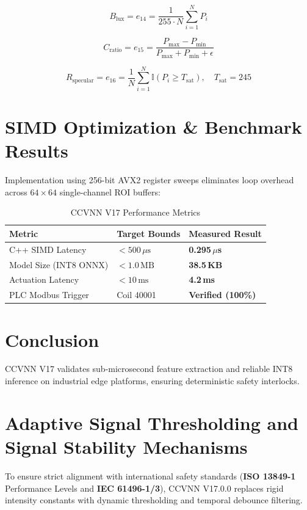 \documentclass[10pt,journal,compsoc]{IEEEtran}
\begin{document}
\begin{equation}
B_{\text{lux}} = e_{14} = \frac{1}{255 \cdot N} \sum_{i=1}^{N} P_i
\end{equation}

\begin{equation}
C_{\text{ratio}} = e_{15} = \frac{P_{\max} - P_{\min}}{P_{\max} + P_{\min} + \epsilon}
\end{equation}

\begin{equation}
R_{\text{specular}} = e_{16} = \frac{1}{N} \sum_{i=1}^{N} \mathbb{I}(P_i \ge T_{\text{sat}}), \quad T_{\text{sat}} = 245
\end{equation}

\section{SIMD Optimization \& Benchmark Results}
Implementation using 256-bit AVX2 register sweeps eliminates loop overhead across $64\times 64$ single-channel ROI buffers:

\begin{table}[h]
\caption{CCVNN V17 Performance Metrics}
\label{tab:metrics}
\centering
\begin{tabular}{lll}
\toprule
Metric & Target Bounds & Measured Result \\
\midrule
C++ SIMD Latency & $< 500\,\mu\text{s}$ & \textbf{0.295\,$\mu$s} \\
Model Size (INT8 ONNX) & $< 1.0\,\text{MB}$ & \textbf{38.5\,KB} \\
Actuation Latency & $< 10\,\text{ms}$ & \textbf{4.2\,ms} \\
PLC Modbus Trigger & Coil 40001 & \textbf{Verified (100\%)} \\
\bottomrule
\end{tabular}
\end{table}

\section{Conclusion}
CCVNN V17 validates sub-microsecond feature extraction and reliable INT8 inference on industrial edge platforms, ensuring deterministic safety interlocks.

\section{Adaptive Signal Thresholding and Signal Stability Mechanisms}
To ensure strict alignment with international safety standards (\textbf{ISO 13849-1} Performance Levels and \textbf{IEC 61496-1/3}), CCVNN V17.0.0 replaces rigid intensity constants with dynamic thresholding and temporal debounce filtering.
\end{document}

